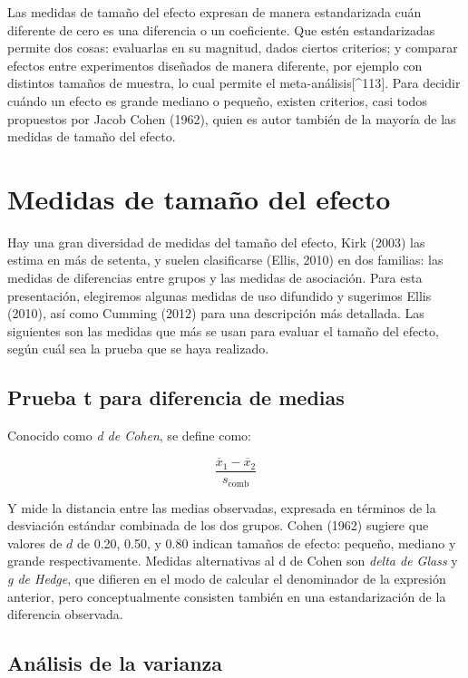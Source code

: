 \documentclass[]{book}
\begin{document}
Las medidas de tamaño del efecto expresan de manera estandarizada cuán
diferente de cero es una diferencia o un coeficiente. Que estén
estandarizadas permite dos cosas: evaluarlas en su magnitud, dados
ciertos criterios; y comparar efectos entre experimentos diseñados de
manera diferente, por ejemplo con distintos tamaños de muestra, lo cual
permite el meta-análisis{[}\^{}113{]}. Para decidir cuándo un efecto es grande
mediano o pequeño, existen criterios, casi todos propuestos por Jacob
Cohen (1962), quien es autor también de la mayoría de las medidas de
tamaño del efecto.

\hypertarget{medidas-de-tamauxf1o-del-efecto}{%
\section{Medidas de tamaño del efecto}\label{medidas-de-tamauxf1o-del-efecto}}

Hay una gran diversidad de medidas del tamaño del efecto, Kirk (2003)
las estima en más de setenta, y suelen clasificarse (Ellis, 2010) en dos
familias: las medidas de diferencias entre grupos y las medidas de
asociación. Para esta presentación, elegiremos algunas medidas de uso
difundido y sugerimos Ellis (2010), así como Cumming (2012) para una
descripción más detallada. Las siguientes son las medidas que más se
usan para evaluar el tamaño del efecto, según cuál sea la prueba que se
haya realizado.

\hypertarget{prueba-t-para-diferencia-de-medias}{%
\subsection{Prueba t para diferencia de medias}\label{prueba-t-para-diferencia-de-medias}}

Conocido como \emph{d de Cohen}, se define como:

\[\frac{{\overline{x}}_{1} - {\overline{x}}_{2}}{s_{\text{comb}}}\]

Y mide la distancia entre las medias observadas, expresada en términos
de la desviación estándar combinada de los dos grupos. Cohen (1962)
sugiere que valores de \(d\) de 0.20, 0.50, y 0.80 indican tamaños de
efecto: pequeño, mediano y grande respectivamente. Medidas alternativas
al d de Cohen son \emph{delta de Glass} y \emph{g de Hedge}, que difieren en el
modo de calcular el denominador de la expresión anterior, pero
conceptualmente consisten también en una estandarización de la
diferencia observada.

\hypertarget{anuxe1lisis-de-la-varianza}{%
\subsection{Análisis de la varianza}\label{anuxe1lisis-de-la-varianza}}
\end{document}
